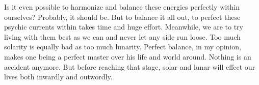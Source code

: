 \begin{footnotesize}
\begin{sffamily}
Is it even possible to harmonize and balance these energies perfectly within ourselves? Probably, it should be. But to balance it all out, to perfect these psychic currents within takes time and huge effort. Meanwhile, we are to try living with them best as we can and never let any side run loose. Too much solarity is equally bad as too much lunarity. Perfect balance, in my opinion, makes one being a perfect master over his life and world around. Nothing is an accident anymore. But before reaching that stage, solar and lunar will effect our lives both inwardly and outwordly.

\hfill


\end{sffamily}
\end{footnotesize}

